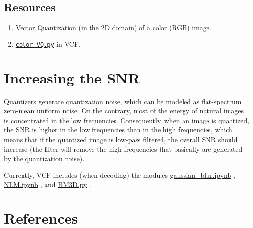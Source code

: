 \subsection*{Resources}

\begin{enumerate}
\item
  \href{https://github.com/vicente-gonzalez-ruiz/vector_quantization/blob/main/docs/spatial_color_VQ.ipynb}{Vector
    Quantization (in the 2D domain) of a color (RGB) image}.
\item
  \href{https://github.com/Sistemas-Multimedia/VCF/blob/main/src/color-VQ.py}{\texttt{color\_VQ.py}}
  in VCF.
\end{enumerate}


\section{Increasing the SNR}
Quantizers generate quantization noise, which can be modeled as
flat-spectrum zero-mean uniform noise. On the contrary, most of the
energy of natural images is concentrated in the low
frequencies. Consequently, when an image is quantized, the
\href{https://en.wikipedia.org/wiki/Signal-to-noise_ratio}{SNR} is
higher in the low frequencies than in the high frequencies, which
means that if the quantized image is low-pass filtered, the overall
SNR should increase (the filter will remove the high frequencies that
basically are generated by the quantization noise).

Currently, VCF includes (when decoding) the modules
\href{https://github.com/vicente-gonzalez-ruiz/vector_quantization/blob/main/docs/gaussian_blur.ipynb}{gaussian\_blur.ipynb} \cite{gonzalez1992digital},
\href{https://github.com/vicente-gonzalez-ruiz/vector_quantization/blob/main/docs/NLM.ipynb}{NLM.ipynb} \cite{buades2005non},
and
\href{https://github.com/vicente-gonzalez-ruiz/vector_quantization/blob/main/docs/BM3D.ipynb}{BM3D.py}
\cite{dabov2007image}.

\section{References}

\renewcommand{\addcontentsline}[3]{}%

